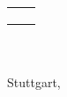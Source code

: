 \begin{titlepage}
    \begin{tabular}{ll}
        \titleexaminers{} & \titleexaminernames{} \\
	& \\
        \titlesupervisors{} & \titlesupervisornames{} \\
    \end{tabular}


    \vfill

		\titleinstitute\\
		\titlechair\\
    Stuttgart, \titledate{} \\
    \endgroup
\end{titlepage}
